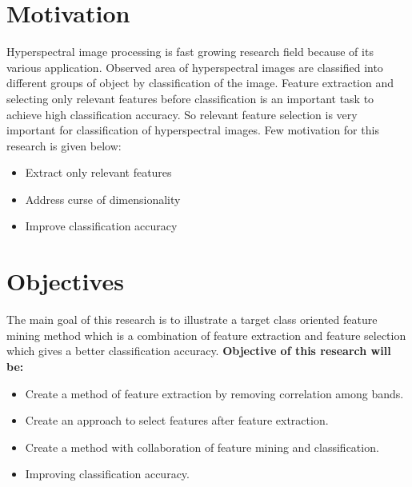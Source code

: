 \documentclass[document.tex]{subfiles}
\begin{document}
\section{Motivation}
\noindent Hyperspectral image processing is fast growing research field because of its various application. Observed area of hyperspectral images are classified into different groups of object by classification of the image. Feature extraction and selecting only relevant features before classification is an important task to achieve high classification accuracy. So relevant feature selection is very important for classification of hyperspectral images. Few motivation for this research is given below:
\begin{itemize}
	\item Extract only relevant features
	\item Address curse of dimensionality
	\item Improve classification accuracy
\end{itemize}

\section{Objectives}
\noindent The main goal of this research is to illustrate a target class oriented feature mining method which is a combination of feature extraction and feature selection which gives a better classification accuracy. 
\textbf{Objective of this research will be:}
\begin{itemize}
	\item Create a method of feature extraction by removing correlation among bands.
	\item Create an approach to select features after feature extraction.
	\item Create a method with collaboration of feature mining and classification.
	\item Improving classification accuracy.
\end{itemize}
\end{document}
